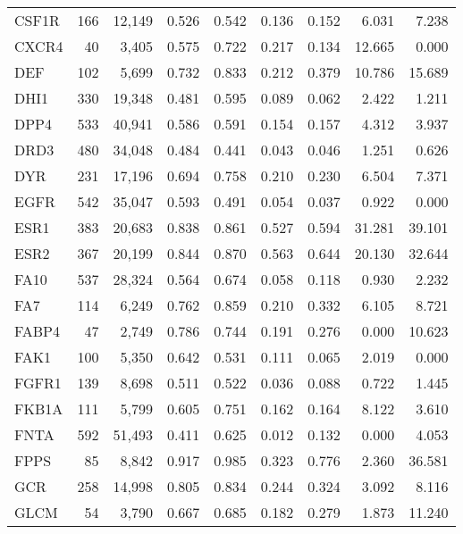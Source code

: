 \begin{center}
\begin{longtable}{lrrrrrrrr}
		CSF1R  & 166   & 12,149   & 0.526   & 0.542   & 0.136   & 0.152   & 6.031   & 7.238  \\
		CXCR4  & 40    & 3,405    & 0.575   & 0.722   & 0.217   & 0.134   & 12.665  & 0.000  \\
		DEF    & 102   & 5,699    & 0.732   & 0.833   & 0.212   & 0.379   & 10.786  & 15.689 \\
		DHI1   & 330   & 19,348   & 0.481   & 0.595   & 0.089   & 0.062   & 2.422   & 1.211  \\
		DPP4   & 533   & 40,941   & 0.586   & 0.591   & 0.154   & 0.157   & 4.312   & 3.937  \\
		DRD3   & 480   & 34,048   & 0.484   & 0.441   & 0.043   & 0.046   & 1.251   & 0.626  \\
		DYR    & 231   & 17,196   & 0.694   & 0.758   & 0.210   & 0.230   & 6.504   & 7.371  \\
		EGFR   & 542   & 35,047   & 0.593   & 0.491   & 0.054   & 0.037   & 0.922   & 0.000  \\
		ESR1   & 383   & 20,683   & 0.838   & 0.861   & 0.527   & 0.594   & 31.281  & 39.101 \\
		ESR2   & 367   & 20,199   & 0.844   & 0.870   & 0.563   & 0.644   & 20.130  & 32.644 \\
		FA10   & 537   & 28,324   & 0.564   & 0.674   & 0.058   & 0.118   & 0.930   & 2.232  \\
		FA7    & 114   & 6,249    & 0.762   & 0.859   & 0.210   & 0.332   & 6.105   & 8.721  \\
		FABP4  & 47    & 2,749    & 0.786   & 0.744   & 0.191   & 0.276   & 0.000   & 10.623 \\
		FAK1   & 100   & 5,350    & 0.642   & 0.531   & 0.111   & 0.065   & 2.019   & 0.000  \\
		FGFR1  & 139   & 8,698    & 0.511   & 0.522   & 0.036   & 0.088   & 0.722   & 1.445  \\
		FKB1A  & 111   & 5,799    & 0.605   & 0.751   & 0.162   & 0.164   & 8.122   & 3.610  \\
		FNTA   & 592   & 51,493   & 0.411   & 0.625   & 0.012   & 0.132   & 0.000   & 4.053  \\
		FPPS   & 85    & 8,842    & 0.917   & 0.985   & 0.323   & 0.776   & 2.360   & 36.581 \\
		GCR    & 258   & 14,998   & 0.805   & 0.834   & 0.244   & 0.324   & 3.092   & 8.116  \\
		GLCM   & 54    & 3,790    & 0.667   & 0.685   & 0.182   & 0.279   & 1.873   & 11.240 \\

\end{longtable}
\end{center}
